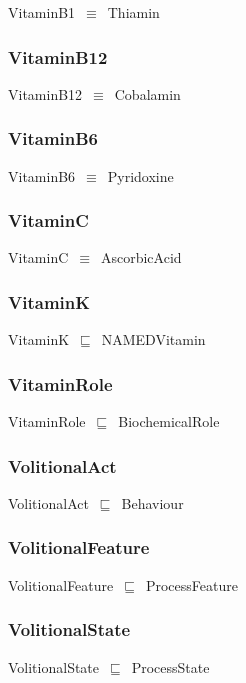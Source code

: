 \documentclass{article}
\begin{document}
VitaminB1~\ensuremath{\equiv}~Thiamin

\subsubsection*{VitaminB12}

VitaminB12~\ensuremath{\equiv}~Cobalamin

\subsubsection*{VitaminB6}

VitaminB6~\ensuremath{\equiv}~Pyridoxine

\subsubsection*{VitaminC}

VitaminC~\ensuremath{\equiv}~AscorbicAcid

\subsubsection*{VitaminK}

VitaminK~\ensuremath{\sqsubseteq}~NAMEDVitamin~

\subsubsection*{VitaminRole}

VitaminRole~\ensuremath{\sqsubseteq}~BiochemicalRole~

\subsubsection*{VolitionalAct}

VolitionalAct~\ensuremath{\sqsubseteq}~Behaviour~

\subsubsection*{VolitionalFeature}

VolitionalFeature~\ensuremath{\sqsubseteq}~ProcessFeature~

\subsubsection*{VolitionalState}

VolitionalState~\ensuremath{\sqsubseteq}~ProcessState~
\end{document}

